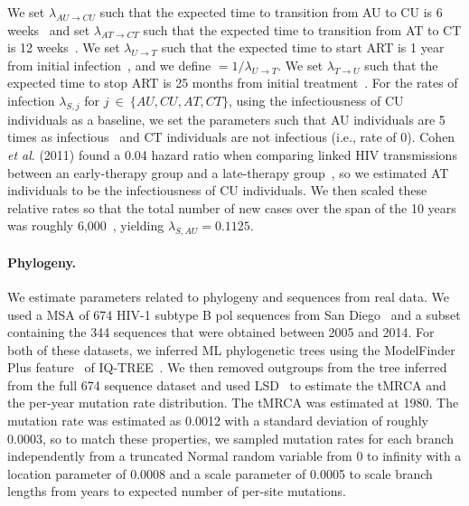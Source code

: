 We set $\lambda_{AU \rightarrow CU}$ such that the expected time to transition from AU to CU is 6 weeks~\cite{Bellan2015a} and set $\lambda_{AT \rightarrow CT}$ such that the expected time to transition from AT to CT is 12 weeks~\cite{Cohen2011}. We set $\lambda_{U \rightarrow T}$ such that the expected time to start ART is 1 year from initial infection~\cite{OBrien2012}, and we define \EART$=1/\lambda_{U \rightarrow T}$. We set $\lambda_{T \rightarrow U}$ such that the expected time to stop ART is 25 months from initial treatment~\cite{Nosyk2015}. For the rates of infection $\lambda_{S,j}$ for $j~\in~\{AU,CU,AT,CT\}$, using the infectiousness of CU individuals as a baseline, we set the parameters such that AU individuals are 5 times as infectious~\cite{Wawer2005} and CT individuals are not infectious (i.e., rate of 0). Cohen \textit{et al}. (2011) found a 0.04 hazard ratio when comparing linked \gls{HIV} transmissions between an early-therapy group and a late-therapy group~\cite{Cohen2011}, so we estimated AT individuals to be  the infectiousness of CU individuals. We then scaled these relative rates so that the total number of new cases over the span of the 10 years was roughly 6,000~\cite{Macchione2015}, yielding $\lambda_{S,AU}= 0.1125$.

\paragraph{Phylogeny.}  We estimate parameters related to phylogeny and sequences from real data. We used a \gls{MSA} of 674 \gls{HIV}-1 subtype B \gls{pol} sequences from San Diego~\cite{Little2014} and a subset containing the 344 sequences that were obtained between 2005 and 2014. For both of these datasets, we inferred \gls{ML} phylogenetic trees using the ModelFinder Plus feature~\cite{Kalyaanamoorthy2017} of IQ-TREE~\cite{Chernomor2016}. We then removed outgroups from the tree inferred from the full 674 sequence dataset and used LSD~\cite{To2016} to estimate the \gls{tMRCA} and the per-year mutation rate distribution. The \gls{tMRCA} was estimated at 1980. The mutation rate was estimated as 0.0012 with a standard deviation of roughly 0.0003, so to match these properties, we sampled mutation rates for each branch independently from a truncated Normal random variable from 0 to infinity with a location parameter of 0.0008 and a scale parameter of 0.0005 to scale branch lengths from years to expected number of per-site mutations.

